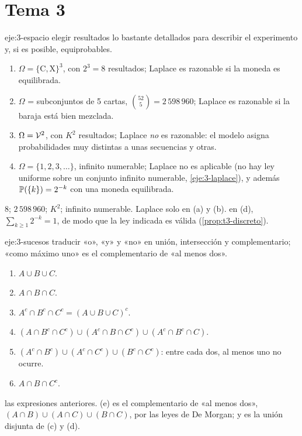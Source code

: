 \section{Tema 3}

\begin{solucion}{eje:3-espacio}
\planteamiento elegir resultados lo bastante detallados para describir el experimento y, si es posible, equiprobables.
\pasos
\begin{enumerate}[label=(\alph*)]
  \item $\Omega=\{\mathrm C,\mathrm X\}^{3}$, con $2^{3}=8$ resultados; Laplace es razonable si la moneda es equilibrada.
  \item $\Omega$ = subconjuntos de 5 cartas, $\binom{52}5=2\,598\,960$; Laplace es razonable si la baraja está bien mezclada.
  \item $\Omega=\mathcal{V}^{2}$, con $K^{2}$ resultados; Laplace \emph{no} es razonable: el modelo asigna probabilidades muy distintas a unas secuencias y otras.
  \item $\Omega=\{1,2,3,\dots\}$, infinito numerable; Laplace no es aplicable (no hay ley uniforme sobre un conjunto infinito numerable, \cref{eje:3-laplace}), y además $\mathbb{P}(\{k\})=2^{-k}$ con una moneda equilibrada.
\end{enumerate}
\resultado $8$; $2\,598\,960$; $K^{2}$; infinito numerable. Laplace solo en (a) y (b).
\comprobacion en (d), $\sum_{k\ge1}2^{-k}=1$, de modo que la ley indicada es válida (\cref{prop:t3-discreto}).
\end{solucion}

\begin{solucion}{eje:3-sucesos}
\planteamiento traducir «o», «y» y «no» en unión, intersección y complementario; «como máximo uno» es el complementario de «al menos dos».
\pasos
\begin{enumerate}[label=(\alph*)]
  \item $A\cup B\cup C$.
  \item $A\cap B\cap C$.
  \item $A^{c}\cap B^{c}\cap C^{c}=(A\cup B\cup C)^{c}$.
  \item $(A\cap B^{c}\cap C^{c})\cup(A^{c}\cap B\cap C^{c})\cup(A^{c}\cap B^{c}\cap C)$.
  \item $(A^{c}\cap B^{c})\cup(A^{c}\cap C^{c})\cup(B^{c}\cap C^{c})$: entre cada dos, al menos uno no ocurre.
  \item $A\cap B\cap C^{c}$.
\end{enumerate}
\resultado las expresiones anteriores.
\comprobacion (e) es el complementario de «al menos dos», $(A\cap B)\cup(A\cap C)\cup(B\cap C)$, por las leyes de De Morgan; y es la unión disjunta de (c) y (d).
\end{solucion}


